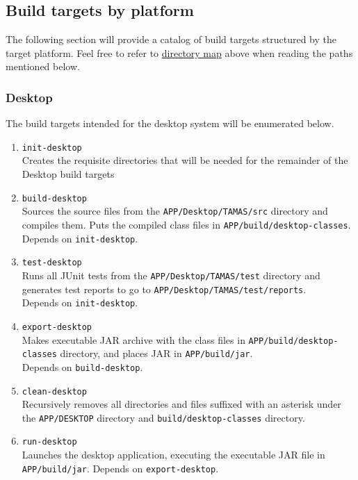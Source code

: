\documentclass[12pt]{report}
\begin{document}
\subsection{Build targets by platform}
\label{s:build-targets}
The following section will provide a catalog of build targets structured by the target platform.
Feel free to refer to \hyperref[s:build-dirtree]{directory map} above when reading the paths
mentioned below.
\subsubsection{Desktop}
The build targets intended for the desktop system will be enumerated below. 
\begin{enumerate}
	\item \texttt{init-desktop}\\
		Creates the requisite directories that will be needed for the remainder of the Desktop build
		targets
	\item \texttt{build-desktop}\\
		Sources the source files from the \texttt{APP/Desktop/TAMAS/src} directory and compiles
		them. Puts the compiled class files in \texttt{APP/build/desktop-classes}.\\
		Depends on \texttt{init-desktop}.
	\item \texttt{test-desktop}\\
		Runs all JUnit tests from the \texttt{APP/Desktop/TAMAS/test} directory and generates test
		reports to go to \texttt{APP/Desktop/TAMAS/test/reports}.\\
		Depends on \texttt{init-desktop}.
	\item \texttt{export-desktop}\\
		Makes executable JAR archive with the class files in \texttt{APP/build/desktop-classes}
		directory, and places JAR in \texttt{APP/build/jar}.\\
		Depends on \texttt{build-desktop}.
	\item \texttt{clean-desktop}\\
		Recursively removes all directories and files suffixed with an asterisk under the
		\texttt{APP/DESKTOP} directory and \texttt{build/desktop-classes} directory.
	\item \texttt{run-desktop}\\
		Launches the desktop application, executing the executable JAR file in
		\texttt{APP/build/jar}.
		Depends on \texttt{export-desktop}.
\end{enumerate}
\end{document}
